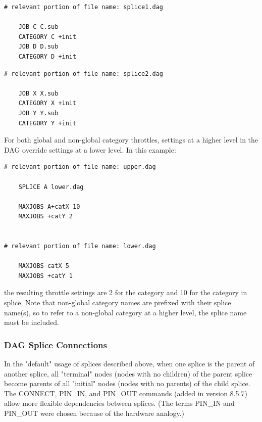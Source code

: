 \begin{verbatim}
# relevant portion of file name: splice1.dag

    JOB C C.sub
    CATEGORY C +init
    JOB D D.sub
    CATEGORY D +init

\end{verbatim}

\begin{verbatim}
# relevant portion of file name: splice2.dag

    JOB X X.sub
    CATEGORY X +init
    JOB Y Y.sub
    CATEGORY Y +init

\end{verbatim}

For both global and non-global category throttles, settings at a higher
level in the DAG override settings at a lower level.
In this example:

\begin{verbatim}
# relevant portion of file name: upper.dag

    SPLICE A lower.dag

    MAXJOBS A+catX 10
    MAXJOBS +catY 2


# relevant portion of file name: lower.dag

    MAXJOBS catX 5
    MAXJOBS +catY 1

\end{verbatim}

the resulting throttle settings are 2 for the  category
and 10 for the  category in splice.
Note that non-global category names are
prefixed with their splice name(s), so to refer to a non-global category 
at a higher level, the splice name must be included.

\subsubsection{\label{sec:DAGSpliceConnections}DAG Splice Connections}

In the "default" usage of splices described above, when one splice is
the parent of another splice, all "terminal" nodes (nodes with no
children) of the parent splice become parents of all "initial" nodes
(nodes with no parents) of the child splice.  The CONNECT,
PIN\_IN, and PIN\_OUT commands (added in version 8.5.7) allow more
flexible dependencies between splices.  (The terms PIN\_IN and PIN\_OUT
were chosen because of the hardware analogy.)

